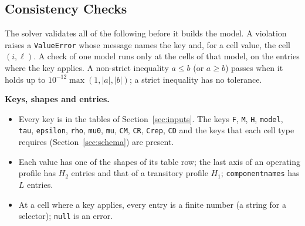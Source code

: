 \documentclass[11pt,a4paper]{article}
\theoremstyle{plain}
\theoremstyle{definition}
\renewcommand{\_}{\textunderscore\allowbreak{}}
\begin{document}
\subsection{Consistency Checks}\label{sec:consistency_checks}

The solver validates all of the following before it builds the model.
A violation raises a \texttt{ValueError} whose message names the key and, for a cell value, the cell $(i,\ell)$.
A check of one model runs only at the cells of that model, on the entries where the key applies.
A non-strict inequality $a \le b$ (or $a \ge b$) passes when it holds up to $10^{-12}\max(1, |a|, |b|)$; a strict inequality has no tolerance.

\textbf{Keys, shapes and entries.}
\begin{itemize}[leftmargin=1.5em]
  \item Every key is in the tables of Section~\ref{sec:inputs}. The keys \texttt{F}, \texttt{M}, \texttt{H}, \texttt{model}, \texttt{tau}, \texttt{epsilon}, \texttt{rho}, \texttt{mu\_0}, \texttt{mu}, \texttt{C\_M}, \texttt{C\_R}, \texttt{C\_rep}, \texttt{C\_D} and the keys that each cell type requires (Section~\ref{sec:schema}) are present.
  \item Each value has one of the shapes of its table row; the last axis of an operating profile has $H_2$ entries and that of a transitory profile $H_1$; \texttt{component\_names} has $L$ entries.
  \item At a cell where a key applies, every entry is a finite number (a string for a selector); \texttt{null} is an error.
\end{itemize}
\end{document}
